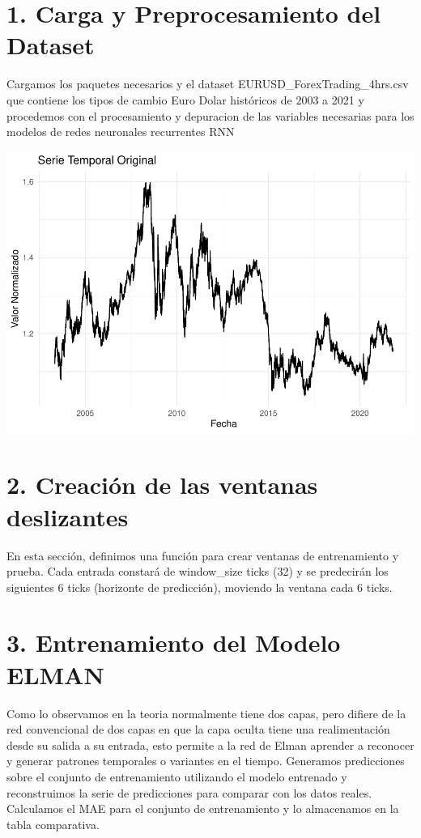 \documentclass[
]{book}
\begin{document}
\section{1. Carga y Preprocesamiento del Dataset}\label{carga-y-preprocesamiento-del-dataset-1}

Cargamos los paquetes necesarios y el dataset EURUSD\_ForexTrading\_4hrs.csv que contiene los tipos de cambio Euro Dolar históricos de 2003 a 2021 y procedemos con el procesamiento y depuracion de las variables necesarias para los modelos de redes neuronales recurrentes RNN

\includegraphics{bookdown_time_series_files/figure-latex/rnn-1-1.pdf}

\section{2. Creación de las ventanas deslizantes}\label{creaciuxf3n-de-las-ventanas-deslizantes}

En esta sección, definimos una función para crear ventanas de entrenamiento y prueba. Cada entrada constará de window\_size ticks (32) y se predecirán los siguientes 6 ticks (horizonte de predicción), moviendo la ventana cada 6 ticks.

\section{3. Entrenamiento del Modelo ELMAN}\label{entrenamiento-del-modelo-elman}

Como lo observamos en la teoria normalmente tiene dos capas, pero difiere de la red convencional de dos capas en que la capa oculta tiene una realimentación desde su salida a su entrada, esto permite a la red de Elman aprender a reconocer y generar patrones temporales o variantes en el tiempo. Generamos predicciones sobre el conjunto de entrenamiento utilizando el modelo entrenado y reconstruimos la serie de predicciones para comparar con los datos reales. Calculamos el MAE para el conjunto de entrenamiento y lo almacenamos en la tabla comparativa.
\end{document}
